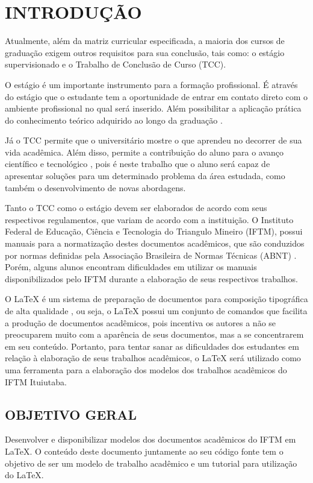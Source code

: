 \newpage
\section{INTRODUÇÃO}
Atualmente, além da matriz curricular especificada, a maioria dos cursos de graduação exigem outros requisitos para sua conclusão, tais como: o estágio supervisionado e o Trabalho de Conclusão de Curso (TCC).

O estágio é um importante instrumento para a formação profissional. É através do estágio que o estudante tem a oportunidade de entrar em contato direto com o ambiente profissional no qual será inserido. Além possibilitar a aplicação prática do conhecimento teórico adquirido ao longo da graduação \cite{Piccinini2012}.

Já o TCC permite que o universitário mostre o que aprendeu no decorrer de sua vida acadêmica. Além disso, permite a contribuição do aluno para o avanço científico e tecnológico \cite{Pereira2009}, pois é neste trabalho que o aluno será capaz de apresentar soluções para um determinado problema da área estudada, como também o desenvolvimento de novas abordagens.

Tanto o TCC como o estágio devem ser elaborados de acordo com seus respectivos regulamentos, que variam de acordo com a instituição. O Instituto Federal de Educação, Ciência e Tecnologia do Triangulo Mineiro (IFTM), possui manuais para a normatização destes documentos acadêmicos, que são conduzidos por normas definidas pela Associação Brasileira de Normas Técnicas (ABNT) \cite{manualTCC,manualEstagio}. Porém, alguns alunos encontram dificuldades em utilizar os manuais disponibilizados pelo IFTM durante a elaboração de seus respectivos trabalhos.

O LaTeX é um sistema de preparação de documentos para composição tipográfica de alta qualidade \cite{LATEX2018}, ou seja, o LaTeX possui um conjunto de comandos que facilita a produção de documentos acadêmicos, pois incentiva os autores a não se preocuparem muito com a aparência de seus documentos, mas a se concentrarem em seu conteúdo. Portanto, para tentar sanar as dificuldades dos estudantes em relação à elaboração de seus trabalhos acadêmicos, o LaTeX será utilizado como uma ferramenta para a elaboração dos modelos dos trabalhos acadêmicos do IFTM Ituiutaba.

\subsection{OBJETIVO GERAL}
Desenvolver e disponibilizar modelos dos documentos acadêmicos do IFTM em LaTeX. O conteúdo deste documento juntamente ao seu código fonte tem o objetivo de ser um modelo de trabalho acadêmico e um tutorial para utilização do LaTeX.


